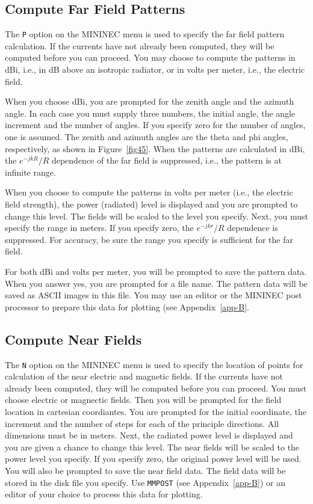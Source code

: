 \documentclass[12pt]{article}
\begin{document}
\subsection{Compute Far Field Patterns}
The \verb+P+ option on the MININEC menu is used to specify the far field
pattern calculation. If the currents have not already been computed,
they will be computed before you can proceed. You may choose to compute
the patterns in dBi, i.e., in dB above an isotropic radiator, or in
volts per meter, i.e., the electric field.

When you choose dBi, you are prompted for the zenith angle and the
azimuth angle. In each case you must supply three numbers, the initial
angle, the angle increment and the number of angles. If you specify zero
for the number of angles, one is assumed. The zenith and azimuth angles
are the theta and phi angles, respectively, as shown in Figure~\ref{fig45}.
When the patterns are calculated in dBi, the $e^{-jkR}/R$ dependence of
the far field is suppressed, i.e., the pattern is at infinite range.

When you choose to compute the patterns in volts per meter (i.e., the
electric field strength), the power (radiated) level is displayed and
you are prompted to change this level. The fields will be scaled to the
level you specify. Next, you must specify the range in meters. If you
specify zero, the $e^{-jkr}/R$ dependence is suppressed. For accuracy,
be sure the range you specify is sufficient for the far field.

For both dBi and volts per meter, you will be prompted to save the
pattern data. When you answer yes, you are prompted for a file name. The
pattern data will be saved as ASCII images in this file. You may use an
editor or the MININEC post processor to prepare this data for plotting
(see Appendix~\ref{app-B}.

\subsection{Compute Near Fields}
The \verb+N+ option on the MININEC menu is used to specify the location
of points for calculation of the near electric and magnetic fields. If
the currents have not already been computed, they will be computed
before you can proceed. You must choose electric or magnectic fields.
Then you will be prompted for the field location in cartesian
coordiantes. You are prompted for the initial coordinate, the increment
and the number of steps for each of the principle directions. All
dimensions must be in meters. Next, the radiated power level is
displayed and you are given a chance to change this level. The near
fields will be scaled to the power level you specify. If you specify
zero, the original power level will be used. You will also be prompted
to save the near field data. The field data will be stored in the disk
file you specify. Use \verb+MMPOST+ (see Appendix~\ref{app-B}) or an
editor of your choice to process this data for plotting.
\end{document}
